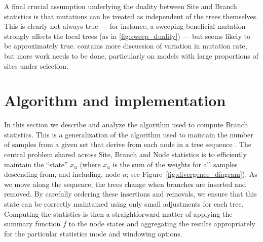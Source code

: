 \documentclass{article}
\begin{document}

A final crucial assumption underlying the duality between Site and Branch
statistics is that mutations can be treated as independent of the trees themselves.
This is clearly not always true --- for instance,
a sweeping beneficial mutation strongly affects the local trees (as in \autoref{fig:sweep_duality}) ---
but seems likely to be approximately true.
\citet{ralph2019empirical} contains more discussion of variation in mutation rate,
but more work needs to be done, particularly on models with large proportions of sites under selection.


\section*{Algorithm and implementation}

In this section we describe and analyze the algorithm used
to compute Branch statistics. This is a generalization
of the algorithm used to maintain the number of samples from a
given set that derive from each node in a tree
sequence \cite[Algorithm L]{kelleher2016efficient}. The central
problem shared across Site, Branch and Node statistics
is to efficiently maintain the ``state'' $x_u$ (where $x_u$ is the
sum of the weights for all samples descending
from, and including, node $u$; see Figure~\ref{fig:divergence_diagram}).
As we move along the sequence, the trees change when branches are inserted and removed.
By carefully ordering these insertions and removals,
we ensure that this state can be correctly maintained
using only small adjustments for each tree.
Computing the statistics is then a straightforward matter of applying the summary function $f$
to the node states and aggregating the results appropriately for the
particular statistics mode and windowing options.
\end{document}
